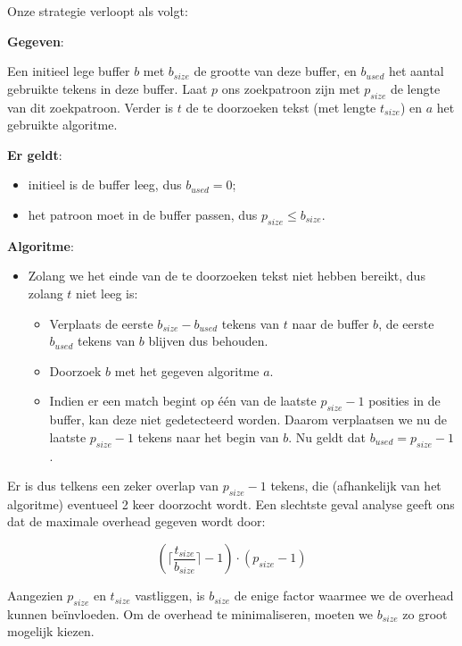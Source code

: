 \documentclass[a4paper,11pt]{article}
\begin{document}
Onze strategie verloopt als volgt:

\textbf{Gegeven}:

Een initieel lege buffer $b$ met $b_{size}$ de grootte van deze buffer, en
$b_{used}$ het aantal gebruikte tekens in deze buffer. Laat $p$ ons zoekpatroon
zijn met $p_{size}$ de lengte van dit zoekpatroon. Verder is $t$ de te
doorzoeken tekst (met lengte $t_{size}$) en $a$ het gebruikte algoritme.

\textbf{Er geldt}:

\begin{itemize}
    \item initieel is de buffer leeg, dus $b_{used} = 0$;
    \item het patroon moet in de buffer passen, dus $p_{size} \leq b_{size}$.
\end{itemize}

\textbf{Algoritme}:

\begin{itemize}
    \item Zolang we het einde van de te doorzoeken tekst niet hebben bereikt,
    dus zolang $t$ niet leeg is:
    \begin{itemize}
        \item Verplaats de eerste $b_{size} - b_{used}$ tekens van $t$ naar de
        buffer $b$, de eerste $b_{used}$ tekens van $b$ blijven dus behouden.
        \item Doorzoek $b$ met het gegeven algoritme $a$.
        \item Indien er een match begint op \'e\'en van de
        laatste $p_{size} - 1$ posities in de buffer, kan deze niet gedetecteerd
        worden. Daarom verplaatsen we nu de laatste $p_{size} - 1$ tekens naar
        het begin van $b$. Nu geldt dat $b_{used} = p_{size} - 1$.
    \end{itemize}
\end{itemize}

Er is dus telkens een zeker overlap van $p_{size} - 1$ tekens, die (afhankelijk
van het algoritme) eventueel 2 keer doorzocht wordt. Een slechtste geval analyse 
geeft ons dat de maximale overhead gegeven wordt door:

\begin{equation*}
\left( \lceil \frac{t_{size}}{b_{size}} \rceil - 1 \right)
    \cdot \left( p_{size} - 1 \right)
\end{equation*}

Aangezien $p_{size}$ en $t_{size}$ vastliggen, is $b_{size}$ de enige factor
waarmee we de overhead kunnen be\"invloeden. Om de overhead te minimaliseren,
moeten we $b_{size}$ zo groot mogelijk kiezen.
\end{document}

